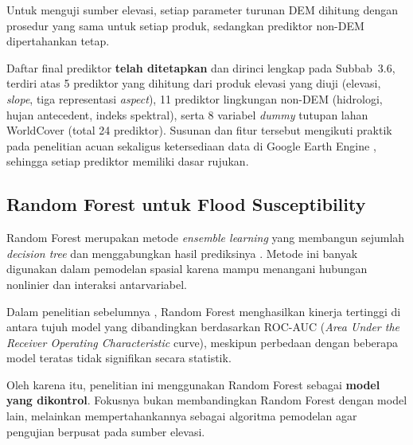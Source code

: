 \documentclass[12pt]{article}
\begin{document}
\begin{center}
\end{center}

Untuk menguji sumber elevasi, setiap parameter turunan DEM dihitung dengan
prosedur yang sama untuk setiap produk, sedangkan prediktor non-DEM
dipertahankan tetap.

Daftar final prediktor \textbf{telah ditetapkan} dan dirinci lengkap pada
Subbab~3.6, terdiri atas 5 prediktor yang dihitung dari produk elevasi yang
diuji (elevasi, \textit{slope}, tiga representasi \textit{aspect}), 11
prediktor lingkungan non-DEM (hidrologi, hujan antecedent, indeks spektral),
serta 8 variabel \textit{dummy} tutupan lahan WorldCover (total 24
prediktor). Susunan dan fitur tersebut mengikuti praktik pada penelitian
acuan sekaligus ketersediaan data di Google Earth Engine
\cite{hakim2026}, sehingga setiap prediktor memiliki dasar rujukan.

\subsection{Random Forest untuk Flood Susceptibility}

Random Forest merupakan metode \textit{ensemble learning} yang membangun
sejumlah \textit{decision tree} dan menggabungkan hasil prediksinya
\cite{breiman2001}. Metode ini banyak digunakan dalam pemodelan spasial
karena mampu menangani hubungan nonlinier dan interaksi antarvariabel.

Dalam penelitian sebelumnya \cite{hakim2026}, Random Forest menghasilkan
kinerja tertinggi di antara tujuh model yang dibandingkan berdasarkan
ROC-AUC (\textit{Area Under the Receiver Operating Characteristic} curve),
meskipun perbedaan dengan beberapa model teratas tidak signifikan secara
statistik.

Oleh karena itu, penelitian ini menggunakan Random Forest sebagai
\textbf{model yang dikontrol}. Fokusnya bukan membandingkan Random Forest dengan model lain, melainkan
mempertahankannya sebagai algoritma pemodelan agar pengujian berpusat pada
sumber elevasi.
\end{document}
